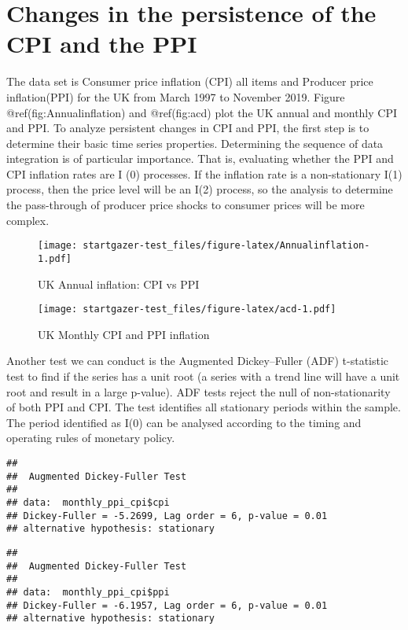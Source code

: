\documentclass[
]{article}
\author{}
\date{\vspace{-2.5em}}
\begin{document}
\hypertarget{changes-in-the-persistence-of-the-cpi-and-the-ppi}{%
\section{Changes in the persistence of the CPI and the
PPI}\label{changes-in-the-persistence-of-the-cpi-and-the-ppi}}

The data set is Consumer price inflation (CPI) all items and Producer
price inflation(PPI) for the UK from March 1997 to November 2019. Figure
@ref(fig:Annualinflation) and @ref(fig:acd) plot the UK annual and
monthly CPI and PPI. To analyze persistent changes in CPI and PPI, the
first step is to determine their basic time series properties.
Determining the sequence of data integration is of particular
importance. That is, evaluating whether the PPI and CPI inflation rates
are I (0) processes. If the inflation rate is a non-stationary I(1)
process, then the price level will be an I(2) process, so the analysis
to determine the pass-through of producer price shocks to consumer
prices will be more complex.

\begin{figure}
\centering
\texttt{[image: startgazer-test\_files/figure-latex/Annualinflation-1.pdf]}
\caption{UK Annual inflation: CPI vs PPI}
\end{figure}

\begin{figure}
\centering
\texttt{[image: startgazer-test\_files/figure-latex/acd-1.pdf]}
\caption{UK Monthly CPI and PPI inflation}
\end{figure}

Another test we can conduct is the Augmented Dickey--Fuller (ADF)
t-statistic test to find if the series has a unit root (a series with a
trend line will have a unit root and result in a large p-value). ADF
tests reject the null of non-stationarity of both PPI and CPI. The test
identifies all stationary periods within the sample. The period
identified as I(0) can be analysed according to the timing and operating
rules of monetary policy.

\begin{verbatim}
## 
##  Augmented Dickey-Fuller Test
## 
## data:  monthly_ppi_cpi$cpi
## Dickey-Fuller = -5.2699, Lag order = 6, p-value = 0.01
## alternative hypothesis: stationary
\end{verbatim}

\begin{verbatim}
## 
##  Augmented Dickey-Fuller Test
## 
## data:  monthly_ppi_cpi$ppi
## Dickey-Fuller = -6.1957, Lag order = 6, p-value = 0.01
## alternative hypothesis: stationary
\end{verbatim}
\end{document}
